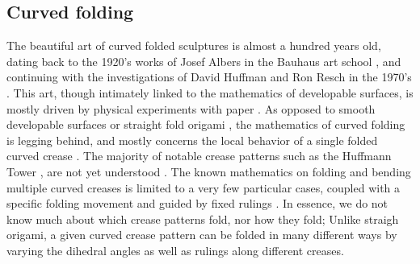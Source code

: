 \subsection{Curved folding}
The beautiful art of curved folded sculptures is almost a hundred years old, dating back to the 1920's works of Josef Albers in the Bauhaus art school \cite{josef_albers_thesis}, and continuing with the investigations of David Huffman and Ron Resch in the 1970's \cite{huffman,resch1974portfolio}. This art, though intimately linked to the mathematics of developable surfaces, is mostly driven by physical experiments with paper \cite{curved_review}. As opposed to smooth developable surfaces \cite{do_carmo} or straight fold origami \cite{computational_line}, the mathematics of curved folding is legging behind, and mostly concerns the local behavior of a single folded curved crease \cite{duncan_folded,mathematical_omnibus,curved_review}. The majority of notable crease patterns such as the Huffmann Tower \cite{huffman2,huffmann_reconstructing}, are not yet understood \cite{demaine2018conic}. The known mathematics on folding and bending multiple curved creases is limited to a very few particular cases, coupled with a specific folding movement and guided by fixed rulings \cite{demaine_lens, demaine2018conic}. In essence, we do not know much about which crease patterns fold, nor how they fold; Unlike straigh origami, a given curved crease pattern can be folded in many different ways by varying the dihedral angles as well as rulings along different creases.

